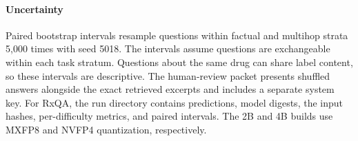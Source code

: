 \documentclass[11pt]{article}
\begin{document}
\paragraph{Uncertainty}
Paired bootstrap intervals resample questions within factual and multihop strata 5,000 times with seed 5018. The intervals assume questions are exchangeable within each task stratum. Questions about the same drug can share label content, so these intervals are descriptive. The human-review packet presents shuffled answers alongside the exact retrieved excerpts and includes a separate system key. For RxQA, the run directory contains predictions, model digests, the input hashes, per-difficulty metrics, and paired intervals. The 2B and 4B builds use MXFP8 and NVFP4 quantization, respectively.
\end{document}
